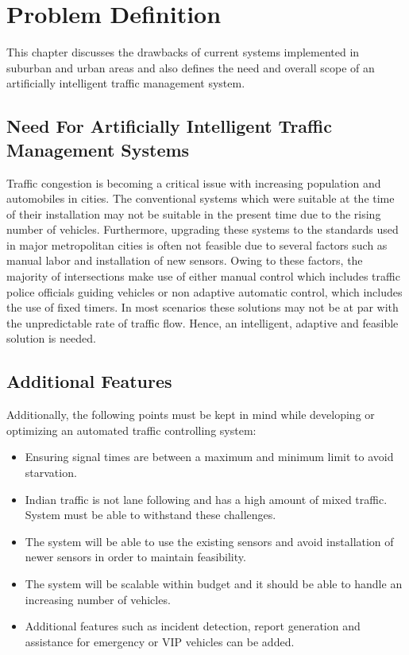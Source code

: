 \documentclass[openany,12pt]{report}
\begin{document}
	
	
	\chapter{Problem Definition}
	
	\hspace*{0.5in}This chapter discusses the drawbacks of current systems implemented in suburban and urban areas and also defines the need and overall scope of an artificially intelligent traffic management system.\\
	
	\section{Need For Artificially Intelligent Traffic Management Systems}
	\hspace*{0.5in}Traffic congestion is becoming a critical issue with increasing population and automobiles in cities. The conventional systems which were suitable at the time of their installation may not be suitable in the present time due to the rising number of vehicles. Furthermore, upgrading these systems to the standards used in major metropolitan cities is often not feasible due to several factors such as manual labor and installation of new sensors. Owing to these factors, the majority of intersections make use of either manual control which includes traffic police officials guiding vehicles or non adaptive automatic control, which includes the use of fixed timers. In most scenarios these solutions may not be at par with the unpredictable rate of traffic flow. Hence, an intelligent, adaptive and feasible solution is needed.\\
	
	\section{Additional Features}
	\hspace*{0.5in}Additionally, the following points must be kept in mind while developing or optimizing an automated traffic controlling system:\\
	
	\begin{itemize}
		\item{Ensuring signal times are between a maximum and minimum limit to avoid starvation.}
		\item{Indian traffic is not lane following and has a high amount of mixed traffic. System must be able to withstand these challenges.}
		\item{The system will be able to use the existing sensors and avoid installation of newer sensors in order to maintain feasibility.}
		\item{The system will be scalable within budget and it should be able to handle an increasing number of vehicles.}
		\item{Additional features such as incident detection, report generation and assistance for emergency or VIP vehicles can be added.}
	\end{itemize}
	
\end{document}
